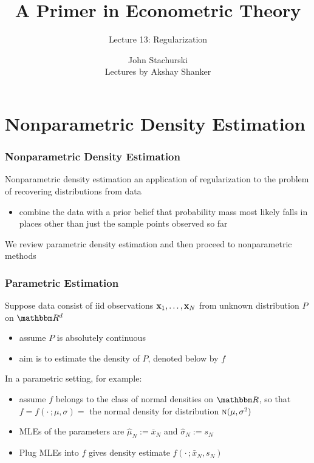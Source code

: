 





\title{A Primer in Econometric Theory}

\subtitle
{Lecture 13: Regularization}

\author{John Stachurski \\ \tiny Lectures by Akshay Shanker}



\begin{frame}
  \titlepage
\end{frame}

\section{Nonparametric Density Estimation}

\begin{frame}\frametitle{Nonparametric Density Estimation}

    \vspace{2em}
    Nonparametric density estimation an application of regularization to the
    problem of recovering distributions from data
    
    \begin{itemize}
        \item combine the data with a
        prior belief that probability mass most likely falls in places other than just
        the sample points observed so far
    \end{itemize}
    
    \vspace{.7em}
    We review parametric
    density estimation and then proceed to nonparametric methods
    
\end{frame}

\begin{frame}\frametitle{Parametric Estimation}
    
    \vspace{2em}
    Suppose data consist of {\sc iid} observations ${\mathbf x}_1, \ldots,
    {\mathbf x}_N$ from unknown distribution $P$ on $\RR^d$
    \begin{itemize}
        \item assume $P$ is absolutely continuous
        \item aim is to estimate the density
        of $P$, denoted below by $f$
    \end{itemize}
    
    In a parametric setting, for example:
    \begin{itemize}
        \item assume $f$ belongs to the class of normal densities on
            $\RR$, so that $f = f(\cdot \, ; \mu, \sigma) =$ the normal density for
            distribution $\textrm{\sc n}(\mu, \sigma^2)$
        \item  MLEs of the parameters are
                $\hat \mu_N := \bar x_N$ and $\hat \sigma_N := s_N$
        \item Plug MLEs into $f$ gives density
        estimate $f(\cdot \,; \bar x_N, s_N)$
    \end{itemize}
    
\end{frame}

